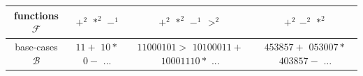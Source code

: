 \documentclass[11pt]{article}
\begin{document}
\begin{table}[htbp]
{\begin{tabular}{|c|c|c|c|}
\makecell{functions\\$\mathcal{F}$} & \makecell{\\$+^2$\\\\$*^2$\\\\$-^1$\\\\}
& \makecell{\\$+^2$\\\\$*^2$\\\\$-^1$\\\\$>^2$\\\\} & \makecell{\\$+^2$\\\\$-^2$\\\\$*^2$\\\\} \\
\hline

\makecell{base-cases\\$\mathcal{B}$} & \makecell{\\$11+$\\\\$10*$\\\\$0-$\\\\...\\\\}
& \makecell{\\$11000101>$\\\\$10100011+$\\\\$10001110*$\\\\...\\\\} 
& \makecell{\\$453857+$\\\\$053007*$\\\\$403857-$\\\\...\\\\}  \\
\hline



\end{tabular}}
\end{table}
\end{document}
